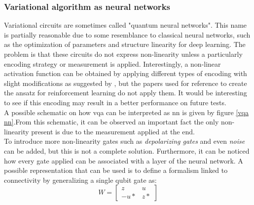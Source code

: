 \subsubsection{Variational algorithm as neural networks}
Variational circuits are sometimes called "quantum neural networks". This name is partially reasonable due to some resemblance to classical neural networks, such as the optimization of parameters and structure linearity for deep learning. The problem is that these circuits do not express non-linearity unless a particularly encoding strategy or measurement is applied. 
Interestingly, a non-linear activation function can be obtained by applying different types of encoding with slight modifications as suggested by \cite{Schuld2021vqa}, but the papers used for reference to create the ansatz for reinforcement learning do not apply them. It would be interesting to see if this encoding may result in a better performance on future tests.\\
A possible schematic on how \acrlong{vqa} can be interpreted as \acrlong{nn} is given by figure \ref{vqa nn}.From this schematic, it can be observed an important fact the only non-linearity present is due to the measurement applied at the end.\\
To introduce more non-linearity gates such as \textit{depolarizing gates} and even \textit{noise} can be added, but this is not a complete solution. Furthermore, it can be noticed how every gate applied can be associated with a layer of the neural network.
A possible representation that can be used is to define a formalism linked to connectivity by generalizing a single qubit gate as:\\
\begin{equation*}
	W = \begin{bmatrix}
		z & u \\
		-u* & z*
	\end{bmatrix}
\end{equation*}
